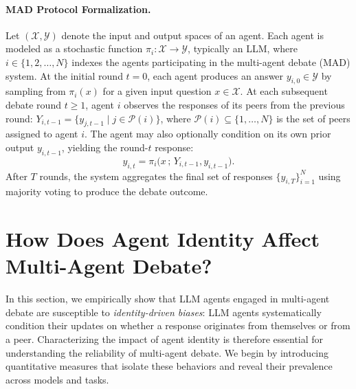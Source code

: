 \documentclass{article}
\begin{document}
\paragraph{MAD Protocol Formalization.} 
Let $(\mathcal{X}, \mathcal{Y})$ denote the input and output spaces of an agent. Each agent is modeled as a stochastic function $\pi_{i}: \mathcal{X} \rightarrow \mathcal{Y}$, typically an LLM, where $i \in \{1,2,\ldots,N\}$ indexes the agents participating in the multi-agent debate (MAD) system.  
At the initial round $t=0$, each agent produces an answer $y_{i,0}\in\mathcal{Y}$ by sampling from $\pi_i(x)$ for a given input question $x\in\mathcal{X}$. At each subsequent debate round $t\geq 1$, agent $i$ observes the responses of its peers from the previous round:  $Y_{i,t-1} = \{y_{j,t-1} \mid j \in \mathcal{P}(i)\}$, where $\mathcal{P}(i)\subseteq \{1,\dots,N\}$ is the set of peers assigned to agent $i$. 
The agent may also optionally condition on its own prior output $y_{i,t-1}$, yielding the round-$t$ response:  
\begin{equation*}
    y_{i,t} = \pi_i\big(x \,;\, Y_{i,t-1}, y_{i,t-1}\big).
\end{equation*}
After $T$ rounds, the system aggregates the final set of responses $\{y_{i,T}\}_{i=1}^N$ using majority voting to produce the debate outcome.


\section{How Does Agent Identity Affect Multi-Agent Debate?}
In this section, we empirically show that LLM agents engaged in multi-agent debate are susceptible to \emph{identity-driven biases}: LLM agents systematically condition their updates on whether a response originates from themselves or from a peer. Characterizing the impact of agent identity is therefore essential for understanding the reliability of multi-agent debate. We begin by introducing quantitative measures that isolate these behaviors and reveal their prevalence across models and tasks.
\end{document}
